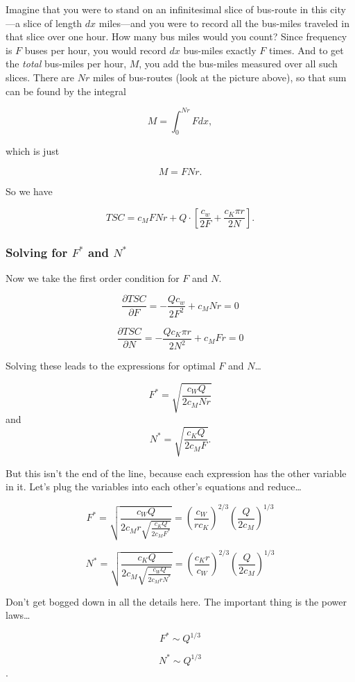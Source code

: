 \documentclass[11pt]{article}
\begin{document}
Imagine that you were to stand on an infinitesimal slice of bus-route in
this city---a slice of length \(dx\) miles---and you were to record all
the bus-miles traveled in that slice over one hour. How many bus miles
would you count? Since frequency is \(F\) buses per hour, you would
record \(dx\) bus-miles exactly \(F\) times. And to get the \emph{total}
bus-miles per hour, \(M\), you add the bus-miles measured over all such
slices. There are \(Nr\) miles of bus-routes (look at the picture
above), so that sum can be found by the integral

\[
M = \int_0^{Nr} Fdx,
\]

which is just

\[
M = FNr.
\]

So we have

\[
TSC = c_M FNr + Q\cdot \left[\frac{c_w}{2F} + \frac{c_K\pi r}{2N}\right].
\]

\subsubsection{\texorpdfstring{Solving for \(F^*\) and
\(N^*\)}{Solving for F\^{}* and N\^{}*}}\label{solving-for-f-and-n}

Now we take the first order condition for \(F\) and \(N\).

\[
\frac{\partial TSC}{\partial F}= -\frac{Qc_w}{2F^2} + c_MNr = 0
\]

\[
\frac{\partial TSC}{\partial N}= -\frac{Qc_K\pi r}{2N^2} + c_MFr = 0
\]

Solving these leads to the expressions for optimal \(F\) and
\(N\)\ldots{}

\[
F^* = \sqrt{\frac{c_WQ}{2c_MNr}}
\] and \[
N^* = \sqrt{\frac{c_KQ}{2c_MF}}.
\]

But this isn't the end of the line, because each expression has the
other variable in it. Let's plug the variables into each other's
equations and reduce\ldots{}

\[
F^* = \sqrt{\frac{c_WQ}{2c_Mr \sqrt{\frac{c_KQ}{2c_MF^*}} }} = \left(\frac{c_W}{r c_K}\right)^{2/3}\left( \frac{Q}{2c_M}\right)^{1/3}
\]

\[
N^* = \sqrt{\frac{c_KQ}{2c_M \sqrt{\frac{c_WQ}{2c_MrN^*}} }} = \left(\frac{c_Kr}{c_W}\right)^{2/3}\left( \frac{Q}{2c_M}\right)^{1/3}
\]

Don't get bogged down in all the details here. The important thing is
the power laws\ldots{}

\[
F^*\sim Q^{1/3}
\]

\[
N^*\sim Q^{1/3}
\].
\end{document}
